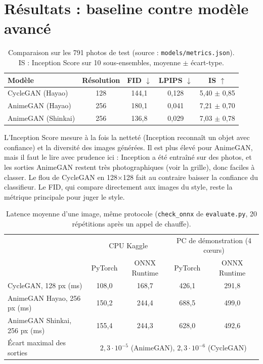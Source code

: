 \documentclass[11pt,a4paper]{article}
\begin{document}
\section{Résultats : baseline contre modèle avancé}

\begin{table}[h]
\centering
\begin{tabular}{lcccc}
\toprule
Modèle & Résolution & FID $\downarrow$ & LPIPS $\downarrow$ & IS $\uparrow$ \\
\midrule
CycleGAN (Hayao) & 128 & 144,1 & 0,128 & 5,40 $\pm$ 0,85 \\
AnimeGAN (Hayao) & 256 & 180,1 & 0,041 & 7,21 $\pm$ 0,70 \\
AnimeGAN (Shinkai) & 256 & 136,8 & 0,029 & 7,03 $\pm$ 0,78 \\
\bottomrule
\end{tabular}
\caption{Comparaison sur les 791 photos de test (source : \texttt{models/metrics.json}).
IS : Inception Score sur 10 sous-ensembles, moyenne $\pm$ écart-type.}
\end{table}

L'Inception Score mesure à la fois la netteté (Inception reconnaît un objet avec confiance)
et la diversité des images générées. Il est plus élevé pour AnimeGAN, mais il faut le lire
avec prudence ici : Inception a été entraîné sur des photos, et les sorties AnimeGAN restent
très photographiques (voir la grille), donc faciles à classer. Le flou de CycleGAN en
128$\times$128 fait au contraire baisser la confiance du classifieur. Le FID, qui compare
directement aux images du style, reste la métrique principale pour juger le style.

\begin{table}[h]
\centering
\begin{tabular}{lcccc}
\toprule
 & \multicolumn{2}{c}{CPU Kaggle} & \multicolumn{2}{c}{PC de démonstration (4 c\oe{}urs)} \\
 & PyTorch & ONNX Runtime & PyTorch & ONNX Runtime \\
\midrule
CycleGAN, 128 px (ms) & 108,0 & 168,7 & 426,1 & 291,8 \\
AnimeGAN Hayao, 256 px (ms) & 150,2 & 244,4 & 688,5 & 499,0 \\
AnimeGAN Shinkai, 256 px (ms) & 155,4 & 244,3 & 628,0 & 492,6 \\
\midrule
Écart maximal des sorties & \multicolumn{4}{c}{$2{,}3\cdot10^{-5}$ (AnimeGAN),
  $2{,}3\cdot10^{-6}$ (CycleGAN)} \\
\bottomrule
\end{tabular}
\caption{Latence moyenne d'une image, même protocole (\texttt{check\_onnx} de
\texttt{evaluate.py}, 20 répétitions après un appel de chauffe).}
\end{table}
\end{document}
